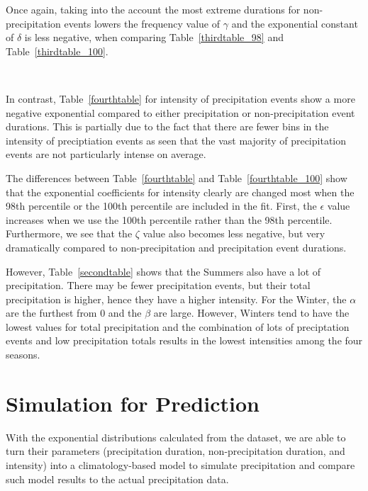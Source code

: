 \documentclass[11pt]{report}
\begin{document}
Once again, taking into the account the most extreme durations for
non-precipitation events lowers the frequency value of $\gamma$ and the
exponential constant of $\delta$ is less negative, when comparing
Table~\ref{thirdtable_98} and Table~\ref{thirdtable_100}.

\





In contrast, Table~\ref{fourthtable} for intensity of precipitation events
show a more negative exponential compared to either precipitation or
non-precipitation event durations. This is partially due to the fact that
there are fewer bins in the intensity of preciptiation events as seen that
the vast majority of precipitation events are not particularly intense on
average.

The differences between Table~\ref{fourthtable} and
Table~\ref{fourthtable_100} show that the exponential coefficients for
intensity clearly are changed most when the 98th percentile or the 100th
percentile are included in the fit. First, the $\epsilon$ value increases
when we use the 100th percentile rather than the 98th
percentile. Furthermore, we see that the $\zeta$ value also becomes less
negative, but very dramatically compared to non-precipitation and
precipitation event durations.

However, Table~\ref{secondtable} shows that the Summers also have a lot of
precipitation. There may be fewer precipitation events, but their total
precipitation is higher, hence they have a higher intensity.  For the
Winter, the $\alpha$ are the furthest from 0 and the $\beta$ are
large. However, Winters tend to have the lowest values for total
precipitation and the combination of lots of preciptation events and low
precipitation totals results in the lowest intensities among the four
seasons.


\clearpage

\section{Simulation for Prediction}\label{sec:sfp}

With the exponential distributions calculated from the dataset, we are able
to turn their parameters (precipitation duration, non-precipitation
duration, and intensity) into a climatology-based model to simulate
precipitation and compare such model results to the actual precipitation
data.
\end{document}
